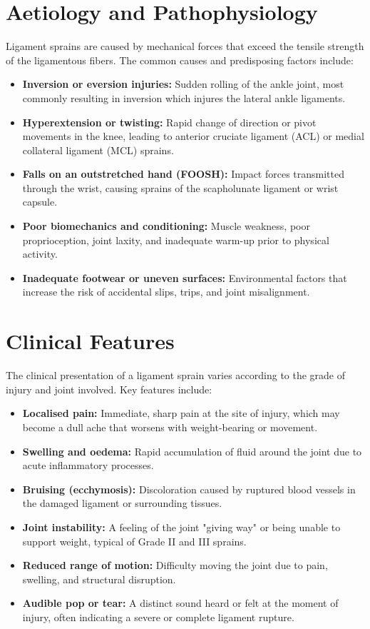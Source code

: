 \section*{Aetiology and Pathophysiology}
Ligament sprains are caused by mechanical forces that exceed the tensile strength of the ligamentous fibers. The common causes and predisposing factors include:
\begin{itemize}
    \item \textbf{Inversion or eversion injuries:} Sudden rolling of the ankle joint, most commonly resulting in inversion which injures the lateral ankle ligaments.
    \item \textbf{Hyperextension or twisting:} Rapid change of direction or pivot movements in the knee, leading to anterior cruciate ligament (ACL) or medial collateral ligament (MCL) sprains.
    \item \textbf{Falls on an outstretched hand (FOOSH):} Impact forces transmitted through the wrist, causing sprains of the scapholunate ligament or wrist capsule.
    \item \textbf{Poor biomechanics and conditioning:} Muscle weakness, poor proprioception, joint laxity, and inadequate warm-up prior to physical activity.
    \item \textbf{Inadequate footwear or uneven surfaces:} Environmental factors that increase the risk of accidental slips, trips, and joint misalignment.
\end{itemize}

\section*{Clinical Features}
The clinical presentation of a ligament sprain varies according to the grade of injury and joint involved. Key features include:
\begin{itemize}
    \item \textbf{Localised pain:} Immediate, sharp pain at the site of injury, which may become a dull ache that worsens with weight-bearing or movement.
    \item \textbf{Swelling and oedema:} Rapid accumulation of fluid around the joint due to acute inflammatory processes.
    \item \textbf{Bruising (ecchymosis):} Discoloration caused by ruptured blood vessels in the damaged ligament or surrounding tissues.
    \item \textbf{Joint instability:} A feeling of the joint "giving way" or being unable to support weight, typical of Grade II and III sprains.
    \item \textbf{Reduced range of motion:} Difficulty moving the joint due to pain, swelling, and structural disruption.
    \item \textbf{Audible pop or tear:} A distinct sound heard or felt at the moment of injury, often indicating a severe or complete ligament rupture.
\end{itemize}

